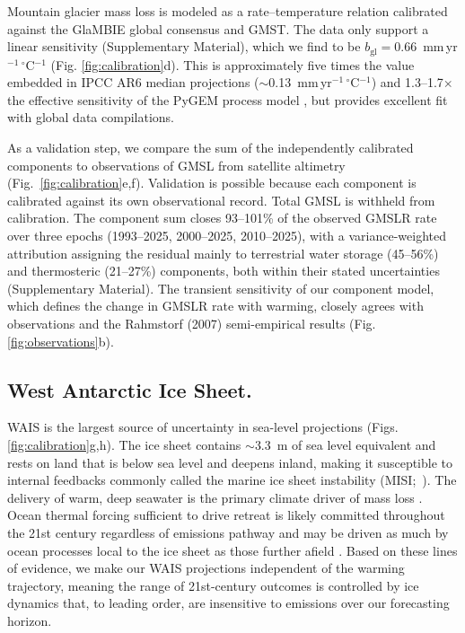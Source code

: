 \documentclass[12pt]{article}
\begin{document}
Mountain glacier mass loss is modeled as a rate--temperature relation calibrated against the GlaMBIE global consensus \citep[2000--2023;][]{GlaMBIE2025} and GMST. The data only support a linear sensitivity (Supplementary Material), which we find to be $b_{\mathrm{gl}} = 0.66$~mm\,yr$^{-1}$\,$^\circ$C$^{-1}$ (Fig. \ref{fig:calibration}d). This is approximately five times the value embedded in IPCC AR6 median projections ($\sim$0.13~mm\,yr$^{-1}$\,$^\circ$C$^{-1}$) and 1.3--1.7$\times$ the effective sensitivity of the PyGEM process model \citep{Rounce2023}, but provides excellent fit with global data compilations.

As a validation step, we compare the sum of the independently calibrated components to observations of GMSL from satellite altimetry (Fig.~\ref{fig:calibration}e,f). Validation is possible because each component is calibrated against its own observational record. Total GMSL is withheld from calibration. The component sum closes 93--101\% of the observed GMSLR rate over three epochs (1993--2025, 2000--2025, 2010--2025), with a variance-weighted attribution assigning the residual mainly to terrestrial water storage (45--56\%) and thermosteric (21--27\%) components, both within their stated uncertainties (Supplementary Material). The transient sensitivity of our component model, which defines the change in GMSLR rate with warming, closely agrees with observations and the Rahmstorf (2007) \citep{Rahmstorf2007} semi-empirical results (Fig. \ref{fig:observations}b).  

\subsection*{West Antarctic Ice Sheet.} WAIS is the largest source of uncertainty in sea-level projections (Figs. \ref{fig:calibration}g,h). The ice sheet contains $\sim$3.3~m of sea level equivalent and rests on land that is below sea level and deepens inland, making it susceptible to internal feedbacks commonly called the marine ice sheet instability (MISI;~\cite{Joughin2014}). The delivery of warm, deep seawater is the primary climate driver of mass loss \citep{Fricker2025}. Ocean thermal forcing sufficient to drive retreat is likely committed throughout the 21st century regardless of emissions pathway \citep{Naughten2023,Rosier2025} and may be driven as much by ocean processes local to the ice sheet as those further afield \cite{Moorman2023}. Based on these lines of evidence, we make our WAIS projections independent of the warming trajectory, meaning the range of 21st-century outcomes is controlled by ice dynamics that, to leading order, are insensitive to emissions over our forecasting horizon. 
\end{document}

